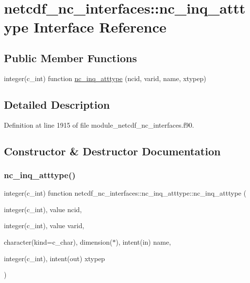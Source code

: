 \hypertarget{interfacenetcdf__nc__interfaces_1_1nc__inq__atttype}{}\section{netcdf\+\_\+nc\+\_\+interfaces\+:\+:nc\+\_\+inq\+\_\+atttype Interface Reference}
\label{interfacenetcdf__nc__interfaces_1_1nc__inq__atttype}
\subsection*{Public Member Functions}
\begin{DoxyCompactItemize}
\item 
integer(c\+\_\+int) function \hyperlink{interfacenetcdf__nc__interfaces_1_1nc__inq__atttype_af5158d798ae648085ca0d0307ddcb8cb}{nc\+\_\+inq\+\_\+atttype} (ncid, varid, name, xtypep)
\end{DoxyCompactItemize}


\subsection{Detailed Description}


Definition at line 1915 of file module\+\_\+netcdf\+\_\+nc\+\_\+interfaces.\+f90.



\subsection{Constructor \& Destructor Documentation}
\mbox{\label{interfacenetcdf__nc__interfaces_1_1nc__inq__atttype_af5158d798ae648085ca0d0307ddcb8cb}} 
\subsubsection{\texorpdfstring{nc\+\_\+inq\+\_\+atttype()}{nc\_inq\_atttype()}}
{\footnotesize\ttfamily integer(c\+\_\+int) function netcdf\+\_\+nc\+\_\+interfaces\+::nc\+\_\+inq\+\_\+atttype\+::nc\+\_\+inq\+\_\+atttype (\begin{DoxyParamCaption}\item[{integer(c\+\_\+int), value}]{ncid,  }\item[{integer(c\+\_\+int), value}]{varid,  }\item[{character(kind=c\+\_\+char), dimension($\ast$), intent(in)}]{name,  }\item[{integer(c\+\_\+int), intent(out)}]{xtypep }\end{DoxyParamCaption})}



